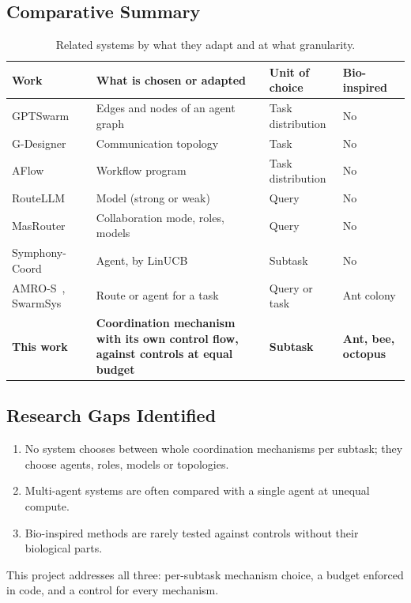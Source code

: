 \documentclass[12pt,a4paper]{article}
\newcommand{\head}[1]{\textbf{#1}}
\begin{document}
\subsection{Comparative Summary}
\begin{table}[H]
\centering\footnotesize
\caption{Related systems by what they adapt and at what granularity.}
\label{tab:lit}
\begin{tabularx}{\textwidth}{@{}P{3.0cm}LP{2.4cm}P{2.0cm}@{}}
\toprule
\head{Work} & \head{What is chosen or adapted} & \head{Unit of choice} & \head{Bio-inspired} \\
\midrule
GPTSwarm~\cite{zhuge2024gptswarm} & Edges and nodes of an agent graph & Task distribution & No \\
G-Designer~\cite{zhang2025gdesigner} & Communication topology & Task & No \\
AFlow~\cite{zhang2025aflow} & Workflow program & Task distribution & No \\
RouteLLM~\cite{ong2025routellm} & Model (strong or weak) & Query & No \\
MasRouter~\cite{yue2025masrouter} & Collaboration mode, roles, models & Query & No \\
Symphony-Coord~\cite{guan2026symphony} & Agent, by LinUCB & Subtask & No \\
AMRO-S~\cite{wang2026amros}, SwarmSys~\cite{li2025swarmsys} & Route or agent for a task & Query or task & Ant colony \\
\midrule
\textbf{This work} & \textbf{Coordination mechanism with its own control flow, against controls at equal budget} & \textbf{Subtask} & \textbf{Ant, bee, octopus} \\
\bottomrule
\end{tabularx}
\end{table}

\subsection{Research Gaps Identified}
\begin{enumerate}[label=\textbf{G\arabic*}]
  \item No system chooses between whole coordination mechanisms per subtask; they choose agents, roles,
        models or topologies.
  \item Multi-agent systems are often compared with a single agent at unequal compute.
  \item Bio-inspired methods are rarely tested against controls without their biological parts.
\end{enumerate}
This project addresses all three: per-subtask mechanism choice, a budget enforced in code, and a control
for every mechanism.
\end{document}
